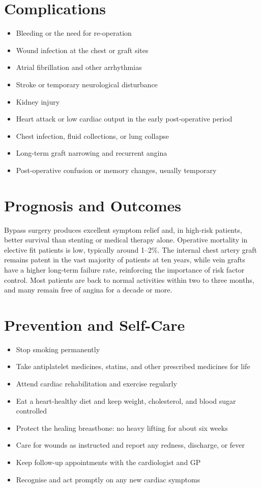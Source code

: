 \section*{Complications}
\begin{itemize}
    \item Bleeding or the need for re-operation
    \item Wound infection at the chest or graft sites
    \item Atrial fibrillation and other arrhythmias
    \item Stroke or temporary neurological disturbance
    \item Kidney injury
    \item Heart attack or low cardiac output in the early post-operative period
    \item Chest infection, fluid collections, or lung collapse
    \item Long-term graft narrowing and recurrent angina
    \item Post-operative confusion or memory changes, usually temporary
\end{itemize}

\section*{Prognosis and Outcomes}
Bypass surgery produces excellent symptom relief and, in high-risk patients, better survival than stenting or medical therapy alone. Operative mortality in elective fit patients is low, typically around 1--2\%. The internal chest artery graft remains patent in the vast majority of patients at ten years, while vein grafts have a higher long-term failure rate, reinforcing the importance of risk factor control. Most patients are back to normal activities within two to three months, and many remain free of angina for a decade or more.

\section*{Prevention and Self-Care}
\begin{itemize}
    \item Stop smoking permanently
    \item Take antiplatelet medicines, statins, and other prescribed medicines for life
    \item Attend cardiac rehabilitation and exercise regularly
    \item Eat a heart-healthy diet and keep weight, cholesterol, and blood sugar controlled
    \item Protect the healing breastbone: no heavy lifting for about six weeks
    \item Care for wounds as instructed and report any redness, discharge, or fever
    \item Keep follow-up appointments with the cardiologist and GP
    \item Recognise and act promptly on any new cardiac symptoms
\end{itemize}

